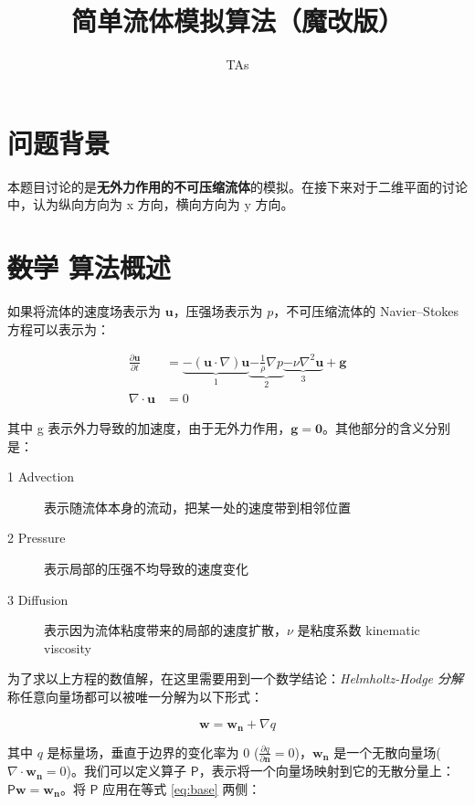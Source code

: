 \documentclass{ctexart}
\title{简单流体模拟算法（魔改版）}
\author{TAs}
\begin{document}
\maketitle

\section{问题背景}

\label{sec:bg}

本题目讨论的是\textbf{无外力作用的不可压缩流体}的模拟。在接下来对于二维平面的讨论中，认为纵向方向为 x 方向，横向方向为 y 方向。

\section{\sout{数学} 算法概述}

如果将流体的速度场表示为 $\mathbf{u}$，压强场表示为 $p$，不可压缩流体的 Navier–Stokes 方程可以表示为：

\begin{equation}
\begin{split}
\label{eq:base}
\frac{\partial \mathbf{u}}{\partial t} & = \underbrace{- (\mathbf{u} \cdot \nabla) \mathbf{u}}_1 \underbrace{- \frac{1}{\rho} \nabla p}_2 \underbrace{- \nu \nabla^2 \mathbf{u}}_3 + \mathbf{g} \\
\nabla \cdot \mathbf{u} & = 0
\end{split}
\end{equation}

其中 g 表示外力导致的加速度，由于无外力作用，$\mathbf{g} = \mathbf{0}$。其他部分的含义分别是：

\begin{description}
  \item[1 Advection] 表示随流体本身的流动，把某一处的速度带到相邻位置
  \item[2 Pressure] 表示局部的压强不均导致的速度变化
  \item[3 Diffusion] 表示因为流体粘度带来的局部的速度扩散，$\nu$ 是粘度系数 kinematic viscosity
\end{description}

为了求以上方程的数值解，在这里需要用到一个数学结论：\textit{Helmholtz-Hodge 分解} 称任意向量场都可以被唯一分解为以下形式：

\begin{equation}
\label{eq:p-operator}
\mathbf{w} = \mathbf{w_n} + \nabla q
\end{equation}

其中 $q$ 是标量场，垂直于边界的变化率为 0 ($\frac{\partial q}{\partial \mathbf{n}} = 0$)，$\mathbf{w_n}$ 是一个无散向量场($\nabla \cdot \mathbf{w_n} = 0$)。我们可以定义算子 $\mathsf{P}$，表示将一个向量场映射到它的无散分量上：$\mathsf{P} \mathbf{w} = \mathbf{w_n}$。将 $\mathsf{P}$ 应用在等式 \ref{eq:base} 两侧：
\end{document}

